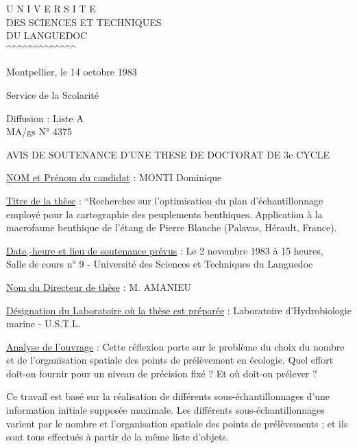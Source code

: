 
\begin{center}
U N I V E R S I T E\\
DES SCIENCES ET TECHNIQUES\\
DU LANGUEDOC\\
\textasciicircum\textasciicircum\textasciicircum\textasciicircum\textasciicircum\textasciicircum\textasciicircum\textasciicircum\textasciicircum\textasciicircum\textasciicircum\textasciicircum\textasciicircum
\end{center}

Montpellier, le 14 octobre 1983

Service de la Scolarité

Diffusion : Liste A\\
MA/gs \hfill N° 4375

\begin{center}
AVIS DE SOUTENANCE D'UNE THESE DE DOCTORAT DE 3e CYCLE

\end{center}

\uline{NOM et Prénom du candidat} : MONTI Dominique

\uline{Titre de la thèse} : ``Recherches sur l'optimisation du plan d'échantillonnage employé pour la cartographie des peuplements benthiques. Application à la macrofaune benthique de l'étang de Pierre Blanche (Palavas, Hérault, France).

\uline{Date,-heure et lieu de soutenance prévus} : Le 2 novembre 1983 à 15 heures,\\
Salle de cours n° 9 - Université des Sciences et Techniques du Languedoc

\uline{Nom du Directeur de thèse} : M. AMANIEU

\uline{Désignation du Laboratoire où la thèse est préparée} : Laboratoire d'Hydrobiologie marine - U.S.T.L.

\uline{Analyse de l'ouvrage} : Cette réflexion porte sur le problème du choix du nombre et de l'organisation spatiale des points de prélèvement en écologie. Quel effort doit-on fournir pour un niveau de précision fixé ? Et où doit-on prélever ?

Ce travail est basé sur la réalisation de différents sous-échantillonnages d'une information initiale supposée maximale. Les différents sous-échantillonnages varient par le nombre et l'organisation spatiale des points de prélèvements ; et ils sont tous effectués à partir de la même liste d'objets.

